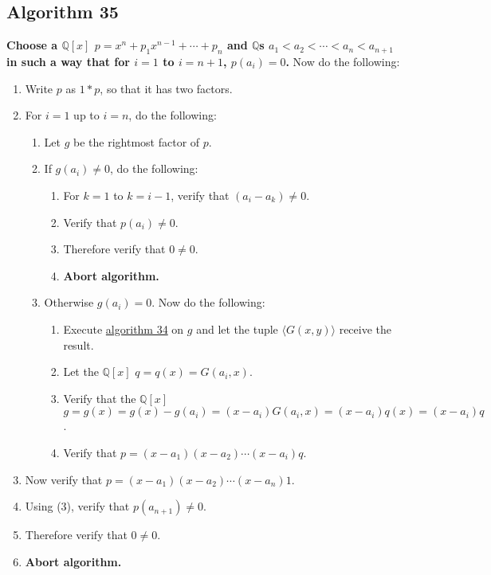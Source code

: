 \documentclass[twocolumn]{article}
\begin{document}
		\subsection{Algorithm 35}\label{sec:algorithm 35}
			\textbf{Choose a $\mathbb{Q}[x]$ $p=x^n+p_1x^{n-1}+\cdots+p_n$ and $\mathbb{Q}$s $a_1<a_2<\cdots<a_n<a_{n+1}$ in such a way that for $i=1$ to $i=n+1$, $p(a_i)=0$.} Now do the following:
			\begin{enumerate}
				\item Write $p$ as $1*p$, so that it has two factors.
				\item For $i=1$ up to $i=n$, do the following:
				\begin{enumerate}
					\item Let $g$ be the rightmost factor of $p$.
					\item If $g(a_i)\ne 0$, do the following:
					\begin{enumerate}
						\item For $k=1$ to $k=i-1$, verify that $(a_i-a_k)\ne 0$.
						\item Verify that $p(a_i)\ne 0$.
						\item Therefore verify that $0\ne 0$.
						\item \textbf{Abort algorithm.}
					\end{enumerate}
					\item Otherwise $g(a_i)=0$. Now do the following:
					\begin{enumerate}
						\item Execute \hyperref[sec:algorithm 34]{algorithm 34} on $g$ and let the tuple $\langle G(x,y)\rangle$ receive the result.
						\item Let the $\mathbb{Q}[x]$ $q=q(x)=G(a_i,x)$.
						\item Verify that the $\mathbb{Q}[x]$ $g=g(x)=g(x)-g(a_i)=(x-a_i)G(a_i,x)=(x-a_i)q(x)=(x-a_i)q$.
						\item Verify that $p=(x-a_1)(x-a_2)\cdots(x-a_i)q$.
					\end{enumerate}
				\end{enumerate}
				\item Now verify that $p=(x-a_1)(x-a_2)\cdots(x-a_n)1$.
				\item Using (3), verify that $p(a_{n+1})\ne 0$.
				\item Therefore verify that $0\ne 0$.
				\item \textbf{Abort algorithm.}
			\end{enumerate}
\end{document}
